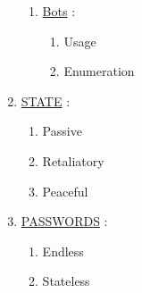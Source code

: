 \documentclass[11pt]{article}
\begin{document}
\begin{enumerate}
\begin{enumerate}
		\item[] \ul{Bots}  :
		\begin{enumerate}
			\item[] Usage
			\item[] Enumeration
		\end{enumerate}
	\end{enumerate}

	\item[] \ul{STATE} :
	\begin{enumerate}
		\item[] Passive
		\item[] Retaliatory
		\item[] Peaceful
	\end{enumerate}

	\item[] \ul{PASSWORDS} :
	\begin{enumerate}
		\item[] Endless
		\item[] Stateless
	\end{enumerate}

\end{enumerate}
\end{document}

